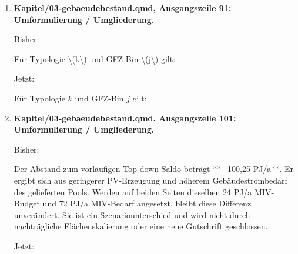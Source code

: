 \documentclass[
  ngerman,
  a4paper,
  DIV=11]{scrreprt}
\newenvironment{Shaded}{\begin{snugshade}}{\end{snugshade}}
\newcommand{\NormalTok}[1]{\textcolor[rgb]{0.00,0.23,0.31}{#1}}
\begin{document}
\begin{enumerate}
\begin{Shaded}
\begin{Highlighting}[]
\NormalTok{Die Auswahl enthält alle 900 Typen, gegliedert nach Geometrie; der Achsenregler zeigt einen lesbaren Ausschnitt. Der Tooltip nennt Archetyp und nationale Fläche. Bedarf wird negativ, PV positiv und die virtuelle Dichtekorrektur schraffiert gezeigt. MFH\_2G besitzt keine zugeordnete GFZ{-}Verteilung und keine nationale Fläche; sein Kontextwert bleibt leer.}

\end{Highlighting}
\end{Shaded}
\item
  \textbf{Kapitel/03-gebaeudebestand.qmd, Ausgangszeile 91:
  Umformulierung / Umgliederung.}

  Bisher:

\begin{Shaded}
\begin{Highlighting}[]
\NormalTok{Für Typologie \textbackslash{}(k\textbackslash{}) und GFZ{-}Bin \textbackslash{}(j\textbackslash{}) gilt:}
\end{Highlighting}
\end{Shaded}

  Jetzt:

\begin{Shaded}
\begin{Highlighting}[]
\NormalTok{Für Typologie $k$ und GFZ{-}Bin $j$ gilt:}
\end{Highlighting}
\end{Shaded}
\item
  \textbf{Kapitel/03-gebaeudebestand.qmd, Ausgangszeile 101:
  Umformulierung / Umgliederung.}

  Bisher:

\begin{Shaded}
\begin{Highlighting}[]
\NormalTok{Der Abstand zum vorläufigen Top{-}down{-}Saldo beträgt **−100,25 PJ/a**. Er ergibt sich aus geringerer PV{-}Erzeugung und höherem Gebäudestrombedarf des gelieferten Pools. Werden auf beiden Seiten dieselben 24 PJ/a MIV{-}Budget und 72 PJ/a MIV{-}Bedarf angesetzt, bleibt diese Differenz unverändert. Sie ist ein Szenariounterschied und wird nicht durch nachträgliche Flächenskalierung oder eine neue Gutschrift geschlossen.}
\end{Highlighting}
\end{Shaded}

  Jetzt:


\end{enumerate}
\end{document}
